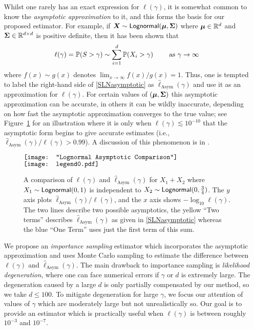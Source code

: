 Whilst one rarely has an exact expression for $\ell(\gamma)$, it is somewhat common to know the \emph{asymptotic approximation} to it, and this forms the basis for our proposed estimator. For example, if $\bm{X} \sim \mathsf{Lognormal}(\bm{\mu}, \bm{\Sigma})$ where $\bm{\mu} \in \mathbb{R}^d$ and $\bm{\Sigma} \in \mathbb{R}^{d \times d}$ is positive definite, then it has been shown that \cite{asmussen2008asymptotics}
\begin{equation} \label{SLNasymptotic}
\ell(\gamma) = \operatorname{{\mathbb P}}(S > \gamma) \sim \sum_{i=1}^d \operatorname{{\mathbb P}}(X_i > \gamma) \qquad \text{ as } \gamma \to \infty
\end{equation}
where $f(x) \sim g(x)$ denotes $\lim_{x \to \infty} f(x)/g(x) = 1$. Thus, one is tempted to label the right-hand side of \eqref{SLNasymptotic} as $\hat{\ell}_{\mathrm{Asym}}(\gamma)$ and use it as an approximation for $\ell(\gamma)$. For certain values of $(\bm{\mu},\bm{\Sigma})$ this asymptotic approximation can be accurate, in others it can be wildly inaccurate, depending on how fast the asymptotic approximation converges to the true value; see Figure~\ref{fig:slow_convergence} for an illustration where it is only when $\ell(\gamma) \lesssim 10^{-10}$ that the asymptotic form begins to give accurate estimates (i.e., $\hat{\ell}_{\mathrm{Asym}}(\gamma) / \ell(\gamma) > 0.99$). A discussion of this phenomenon is in \cite{botev2017fast}.

\begin{figure}
\centering
$\vcenter{\hbox{\texttt{[image: "Lognormal Asymptotic Comparison"]}}}$
 \hspace*{.1in}
 $\vcenter{\hbox{\texttt{[image: legend0.pdf]}}}$
\caption{A comparison of $\ell(\gamma)$ and $\hat{\ell}_{\text{Asym}}(\gamma)$ for $X_1+X_2$ where $X_1 \sim \mathsf{Lognormal}(0, 1)$ is independent to $X_2\sim\mathsf{Lognormal}(0,\frac{3}{4})$. The $y$ axis plots $\hat{\ell}_{\text{Asym}}(\gamma) / \ell(\gamma)$, and the $x$ axis shows ${-}\log_{10} \ell(\gamma)$. The two lines describe two possible asymptotics, the yellow ``Two terms'' describes $\hat{\ell}_{\text{Asym}}(\gamma)$ as given in \eqref{SLNasymptotic} whereas the blue ``One Term'' uses just the first term of this sum.}
\label{fig:slow_convergence}
\end{figure}

We propose an \emph{importance sampling} estimator which incorporates the asymptotic approximation and uses Monte Carlo sampling to estimate the difference between $\ell(\gamma)$ and $\hat{\ell}_{\mathrm{Asym}}(\gamma)$.
The main drawback to importance sampling is \emph{likelihood degeneration}, where one can face numerical errors if $\gamma$ or $d$ is extremely large.
The degeneration caused by a large $d$ is only partially compensated by our method, so we take $d \le 100$.
To mitigate degeneration for large $\gamma$, we focus our attention of values of $\gamma$ which are moderately large but not unrealistically so.
Our goal is to provide an estimator which is practically useful when $\ell(\gamma)$ is between roughly $10^{-3}$ and $10^{-7}$.

